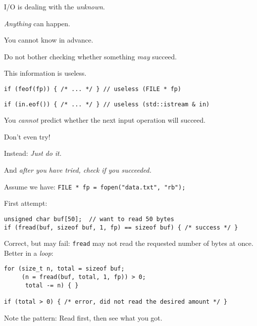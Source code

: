 \documentclass[landscape,a4paper]{article}
\newenvironment{vcframe}{%
\begin{titlepage}
\vspace*{\fill}}{%
\vspace*{\parskip}%
\vspace*{\fill}
\end{titlepage}}
\begin{document}
\begin{vcframe}
\end{vcframe}

\begin{vcframe}\center
I/O is dealing with the \emph{unknown}.

\emph{Anything} can happen.

You cannot know in advance.
\end{vcframe}

\begin{vcframe}\center
\setlength{\parskip}{1\baselineskip}
Do not bother checking whether something \emph{may} succeed.

This information is useless.

\begin{minipage}{\textwidth}
\setlength{\parskip}{1\baselineskip}
\texttt{if (feof(fp)) \{ /* ... */ \}   // useless (FILE * fp)}

\texttt{if (in.eof()) \{ /* ... */ \}   // useless (std::istream \& in)}
\end{minipage}

You \emph{cannot} predict whether the next input operation will succeed.

Don't even try!
\end{vcframe}

\begin{vcframe}\center
\large Instead: \emph{Just do it.}
\end{vcframe}

\begin{vcframe}
\setlength{\parskip}{1\baselineskip}
And \emph{after you have tried, check if you succeeded.}

Assume we have: \texttt{FILE * fp = fopen("data.txt", "rb");}

First attempt:
{\small\begin{verbatim}
unsigned char buf[50];  // want to read 50 bytes
if (fread(buf, sizeof buf, 1, fp) == sizeof buf) { /* success */ }
\end{verbatim}}
Correct, but may fail: \texttt{fread} may not read the requested number of bytes at once. Better in a \emph{loop}:
{\small\begin{verbatim}
for (size_t n, total = sizeof buf;
     (n = fread(buf, total, 1, fp)) > 0;
      total -= n) { }

if (total > 0) { /* error, did not read the desired amount */ }
\end{verbatim}}
Note the pattern: Read first, then see what you got.
\end{vcframe}
\end{document}
